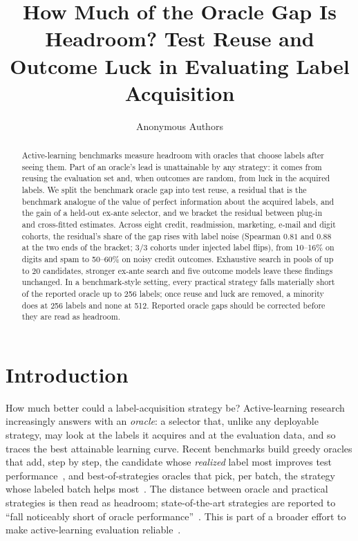 \documentclass[runningheads]{llncs}
\begin{document}
\title{How Much of the Oracle Gap Is Headroom? Test Reuse and Outcome Luck in Evaluating Label Acquisition}
\author{Anonymous Authors}
\maketitle

\begin{abstract}
Active-learning benchmarks measure headroom with oracles that choose labels after seeing them. Part of an oracle's lead is unattainable by any strategy: it comes from reusing the evaluation set and, when outcomes are random, from luck in the acquired labels. We split the benchmark oracle gap into test reuse, a residual that is the benchmark analogue of the value of perfect information about the acquired labels, and the gain of a held-out ex-ante selector, and we bracket the residual between plug-in and cross-fitted estimates. Across eight credit, readmission, marketing, e-mail and digit cohorts, the residual's share of the gap rises with label noise (Spearman $0.81$ and $0.88$ at the two ends of the bracket; 3/3 cohorts under injected label flips), from 10--16\% on digits and spam to 50--60\% on noisy credit outcomes. Exhaustive search in pools of up to 20 candidates, stronger ex-ante search and five outcome models leave these findings unchanged. In a benchmark-style setting, every practical strategy falls materially short of the reported oracle up to 256 labels; once reuse and luck are removed, a minority does at 256 labels and none at 512. Reported oracle gaps should be corrected before they are read as headroom.
\end{abstract}

\section{Introduction}
\label{sec:intro}
How much better could a label-acquisition strategy be? Active-learning research increasingly answers with an \emph{oracle}: a selector that, unlike any deployable strategy, may look at the labels it acquires and at the evaluation data, and so traces the best attainable learning curve. Recent benchmarks build greedy oracles that add, step by step, the candidate whose \emph{realized} label most improves test performance~\cite{werner2023comparable,werner2024cdalbench}, and best-of-strategies oracles that pick, per batch, the strategy whose labeled batch helps most~\cite{huseljic2026boss}. The distance between oracle and practical strategies is then read as headroom; state-of-the-art strategies are reported to ``fall noticeably short of oracle performance''~\cite{huseljic2026boss}. This is part of a broader effort to make active-learning evaluation reliable~\cite{luth2023navigating,ji2023randomness}.
\end{document}
